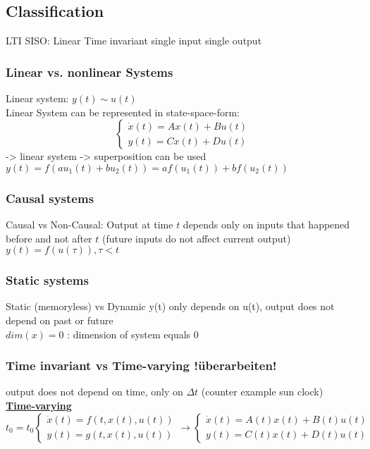 \subsection{Classification}
    LTI SISO: Linear Time invariant single input single output
    \subsubsection*{Linear vs. nonlinear Systems}
        Linear system: $y(t) \sim u(t)$\\
        Linear System can be represented in state-space-form:
        \begin{equation}\label{eqn:LTI}
            \begin{cases}
                \dot{x}(t) = Ax(t) + Bu(t)\\
                y(t) = Cx(t) + Du(t)
            \end{cases}
        \end{equation}
        -> linear system -> superposition can be used\\
        $y(t) = f(au_1(t)+bu_2(t)) = af(u_1(t)) + bf(u_2(t))$
    
    \subsubsection*{Causal systems}
        Causal vs Non-Causal:
        Output at time $t$ depends only on inputs that happened before and not after $t$ (future inputs do not affect current output)\\
        $y(t) = f(u(\tau)), \tau < t$
    
    \subsubsection*{Static systems}
        Static (memoryless) vs Dynamic
        y(t) only depends on u(t), output does not depend on past or future\\
        $dim(x) = 0$ : dimension of system equals 0

    \subsubsection*{Time invariant vs Time-varying !überarbeiten!}
        output does not depend on time, only on $\Delta t$ (counter example sun clock)\\
        {\centering\textbf{\underline{Time-varying}}}
        \begin{equation}
            t_0 = t_0
            \begin{cases}
                \dot{x}(t) = f(t, x(t), u(t))\\
                y(t) = g(t, x(t), u(t))
            \end{cases}
            \rightarrow
            \begin{cases}
                \dot{x}(t) = A(t)x(t) + B(t)u(t)\\
                y(t) = C(t)x(t) + D(t)u(t)
            \end{cases}
        \end{equation}

